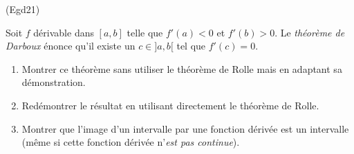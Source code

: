 \begin{tiny}(Egd21)\end{tiny} 
Soit $f$ dérivable dans $[a,b]$ telle que $f'(a)<0$ et $f'(b)>0$. Le \emph{théorème de Darboux} énonce qu'il existe un $c\in]a,b[$ tel que $f'(c)=0$.
\begin{enumerate}
 \item Montrer ce théorème sans utiliser le théorème de Rolle mais en adaptant sa démonstration.
 \item Redémontrer le résultat en utilisant directement le théorème de Rolle.
 \item Montrer que l'image d'un intervalle par une fonction dérivée est un intervalle (même si cette fonction dérivée n'\emph{est pas continue}).
\end{enumerate}
